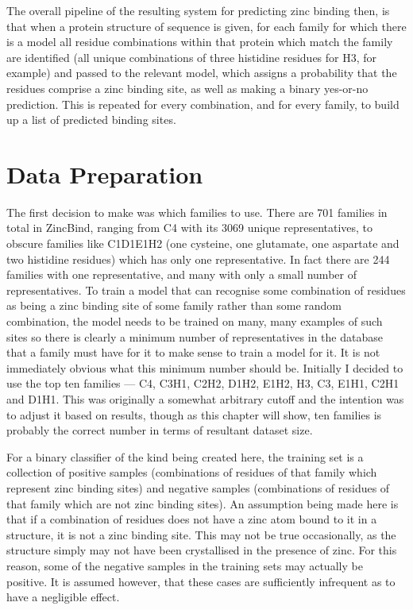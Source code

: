 The overall pipeline of the resulting system for predicting zinc binding then, is that when a protein structure of sequence is given, for each family for which there is a model all residue combinations within that protein which match the family are identified (all unique combinations of three histidine residues for H3, for example) and passed to the relevant model, which assigns a probability that the residues comprise a zinc binding site, as well as making a binary yes-or-no prediction. This is repeated for every combination, and for every family, to build up a list of predicted binding sites.

\section{Data Preparation}

The first decision to make was which families to use. There are 701 families in total in ZincBind, ranging from C4 with its 3069 unique representatives, to obscure families like C1D1E1H2 (one cysteine, one glutamate, one aspartate and two histidine residues) which has only one representative. In fact there are 244 families with one representative, and many with only a small number of representatives. To train a model that can recognise some combination of residues as being a zinc binding site of some family rather than some random combination, the model needs to be trained on many, many examples of such sites so there is clearly a minimum number of representatives in the database that a family must have for it to make sense to train a model for it. It is not immediately obvious what this minimum number should be. Initially I decided to use the top ten families --- C4, C3H1, C2H2, D1H2, E1H2, H3, C3, E1H1, C2H1 and D1H1. This was originally a somewhat arbitrary cutoff and the intention was to adjust it based on results, though as this chapter will show, ten families is probably the correct number in terms of resultant dataset size.

For a binary classifier of the kind being created here, the training set is a collection of positive samples (combinations of residues of that family which represent zinc binding sites) and negative samples (combinations of residues of that family which are not zinc binding sites). An assumption being made here is that if a combination of residues does not have a zinc atom bound to it in a structure, it is not a zinc binding site. This may not be true occasionally, as the structure simply may not have been crystallised in the presence of zinc. For this reason, some of the negative samples in the training sets may actually be positive. It is assumed however, that these cases are sufficiently infrequent as to have a negligible effect.

